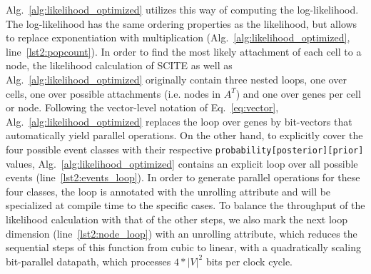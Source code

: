 Alg.~\ref{alg:likelihood_optimized} utilizes this way of computing the log-likelihood. The log-likelihood has the same ordering properties as the likelihood, but allows to replace exponentiation with multiplication (Alg.~\ref{alg:likelihood_optimized}, line~\ref{lst2:popcount}).
In order to find the most likely attachment of each cell to a node, the likelihood calculation of \ac{SCITE} as well as Alg.~\ref{alg:likelihood_optimized} originally contain three nested loops, one over cells, one over possible attachments (i.e. nodes in $A^T$) and one over genes per cell or node.
Following the vector-level notation of Eq.~\ref{eq:vector}, Alg.~\ref{alg:likelihood_optimized} replaces the loop over genes by bit-vectors that automatically yield parallel operations.
On the other hand, to explicitly cover the four possible event classes with their respective \texttt{probability[posterior][prior]} values, Alg.~\ref{alg:likelihood_optimized} contains an explicit loop over all possible events (line~\ref{lst2:events_loop}). In order to generate parallel operations for these four classes, the loop is annotated with the unrolling attribute and will be specialized at compile time to the specific cases.
To balance the throughput of the likelihood calculation with that of the other steps, we also mark the next loop dimension (line~\ref{lst2:node_loop}) with an unrolling attribute, which reduces the sequential steps of this function from cubic to linear, with a quadratically scaling bit-parallel datapath, which processes $4*|V|^2$ bits per clock cycle.

